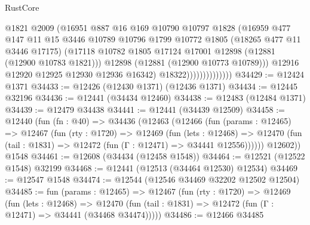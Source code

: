 \begin{lexlean}{RustCore}
\begin{coremodule}
                                @1821
                                @2009
                                (@16951
                                  @887
                                  @16
                                  @169
                                  @10790
                                  @10797
                                  @1828
                                  (@16959
                                    @477
                                    @147
                                    @11
                                    @15
                                    @3446
                                    @10789
                                    @10796
                                    @1799
                                    @10772
                                    @1805
                                    (@18265 @477 @11 @3446 @17175)
                                    (@17118
                                      @10782
                                      @1805
                                      @17124
                                      @17001
                                      @12898
                                      (@12881 (@12900 @10783 @1821)))
                                    @12898
                                    (@12881 (@12900 @10773 @10789)))
                                  @12916
                                  @12920
                                  @12925
                                  @12930
                                  @12936
                                  @16342)
                                @18322))))))))))))))
@34429 := @12424 @1371
@34433 := @12426 (@12430 @1371) (@12436 @1371)
@34434 := @12445 @32196
@34436 := @12441 (@34434 @12460)
@34438 := @12483 (@12484 @1371)
@34439 := @12479 @34438
@34441 := @12441 (@34439 @12509)
@34458 := @12440
    (fun (fn : @40) =>
    @34436
      (@12463
        (@12466
          (fun (params : @12465) =>
          @12467
            (fun (rty : @1720) =>
            @12469
              (fun (lets : @12468) =>
              @12470 (fun (tail : @1831) => @12472 (fun (Γ : @12471) => @34441 @12556))))))
        @12602))
    @1548
@34461 := @12608 (@34434 (@12458 @1548))
@34464 := @12521 (@12522 @1548) @32199
@34468 := @12441 (@12513 (@34464 @12530) @12534)
@34469 := @12547 @1548
@34474 := @12544 (@12546 @34469 @32202 @12502 @12504)
@34485 := fun (params : @12465) =>
  @12467
    (fun (rty : @1720) =>
    @12469
      (fun (lets : @12468) =>
      @12470 (fun (tail : @1831) => @12472 (fun (Γ : @12471) => @34441 (@34468 @34474)))))
@34486 := @12466 @34485

\end{coremodule}
\end{lexlean}

